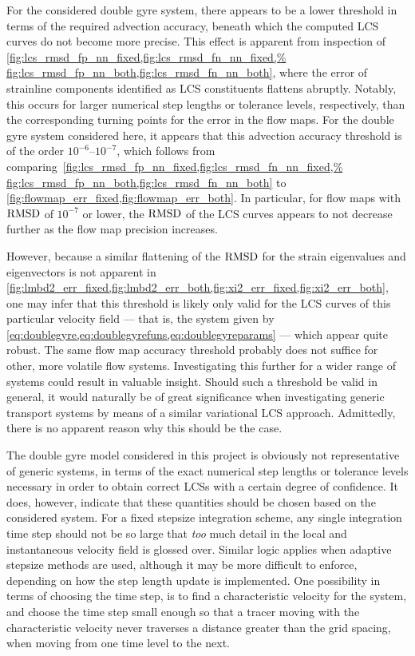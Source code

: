 For the considered double gyre system, there appears to be a lower threshold
in terms of the required advection accuracy, beneath which the computed LCS
curves do not become more precise. This effect is apparent
from inspection of
\cref{fig:lcs_rmsd_fp_nn_fixed,fig:lcs_rmsd_fn_nn_fixed,%
fig:lcs_rmsd_fp_nn_both,fig:lcs_rmsd_fn_nn_both}, where the error of strainline
components identified as LCS constituents flattens abruptly. Notably, this
occurs for larger numerical step lengths or tolerance levels, respectively,
than the corresponding turning points for the error in the flow maps.
For the double gyre system considered here, it appears that this advection
accuracy threshold is of the order $10^{-6}$--$10^{-7}$, which follows from
comparing~\cref{fig:lcs_rmsd_fp_nn_fixed,fig:lcs_rmsd_fn_nn_fixed,%
fig:lcs_rmsd_fp_nn_both,fig:lcs_rmsd_fn_nn_both} to
\cref{fig:flowmap_err_fixed,fig:flowmap_err_both}. In particular, for flow maps
with $\operatorname{RMSD}$ of $10^{-7}$ or lower, the $\operatorname{RMSD}$ of the LCS curves appears to
not decrease further as the flow map precision increases.

However, because a similar flattening of the $\operatorname{RMSD}$ for the strain eigenvalues
and eigenvectors is not apparent in
\cref{fig:lmbd2_err_fixed,fig:lmbd2_err_both,fig:xi2_err_fixed,fig:xi2_err_both},
one may infer that this threshold is likely only valid for the LCS curves
of this particular velocity field --- that is, the system given by
\cref{eq:doublegyre,eq:doublegyrefuns,eq:doublegyreparams}%
--- which
appear quite robust. The same flow map accuracy threshold probably does not
suffice for other, more volatile flow systems. Investigating
this further for a wider range of systems could result in valuable insight.
Should such a threshold be valid in general, it would naturally be of great
significance when investigating generic transport systems by means of a
similar variational LCS approach. Admittedly, there is no apparent reason why
this should be the case.

The double gyre model considered in this project is obviously not representative
of generic systems, in terms of the exact numerical step lengths or tolerance
levels necessary in order to obtain correct LCSs with a certain
degree of confidence. It does, however, indicate that these quantities should
be chosen based on the considered system. For a fixed stepsize integration
scheme, any single integration time step should not be so large that \emph{too}
much detail in the local and instantaneous velocity field is glossed over.
Similar logic applies when adaptive stepsize methods are used, although it
may be more difficult to enforce, depending on how the step length
update is implemented. One possibility in terms of choosing the time step, is to
find a characteristic velocity for the system, and choose the time step small
enough so that a tracer moving with the characteristic velocity never traverses
a distance greater than the grid spacing, when moving from one time level to
the next.

